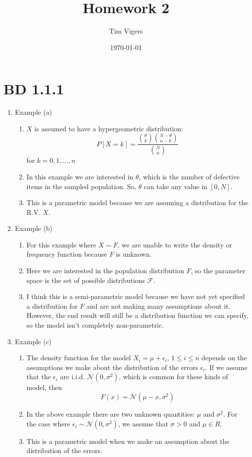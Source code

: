 \documentclass[a4paper,12pt]{article}
\begin{document}
\title{Homework 2}
\author{Tim Vigers}
\date{\today}
\maketitle

\section{BD 1.1.1}
\begin{enumerate}
  \item Example (a)
  \begin{enumerate}
     \item $X$ is assumed to have a hypergeometric distribution:
        $$P[X=k]=\frac{{\theta\choose k}{N-\theta\choose n-k}}{{N\choose n}}$$ for $k=0,1,...,n$
     \item In this example we are interested in $\theta$, which is the number of defective items in the sampled population. So, $\theta$ can take any value in $[0,N]$.
     \item This is a parametric model because we are assuming a distribution for the R.V. $X$.
   \end{enumerate}
  \item Example (b)
  \begin{enumerate}
     \item For this example where $X\sim F$, we are unable to write the density or frequency function because $F$ is unknown.
     \item Here we are interested in the population distribution $F$, so the parameter space is the set of possible distributions $\mathcal{F}$.
     \item I think this is a semi-parametric model because we have not yet specified a distribution for $F$ and are not making many assumptions about it. However, the end result will still be a distribution function we can specify, so the model isn't completely non-parametric.
   \end{enumerate}
   \item Example (c)
   \begin{enumerate}
      \item The density function for the model $X_i=\mu+\epsilon_i$, $1\leq i \leq n$ depends on the assumptions we make about the distribution of the errors $\epsilon_i$. If we assume that the $\epsilon_i$ are i.i.d. $\mathcal{N}(0,\sigma^2)$, which is common for these kinds of model, then $$F(x)=\mathcal{N}(\mu-x,\sigma^2)$$
      \item In the above example there are two unknown quantities: $\mu$ and $\sigma^2$. For the case where $\epsilon_i\sim\mathcal{N}(0,\sigma^2)$, we assume that $\sigma>0$ and $\mu\in R$.
      \item This is a parametric model when we make an assumption about the distribution of the errors. 
    \end{enumerate}
\end{enumerate}
\end{document}
